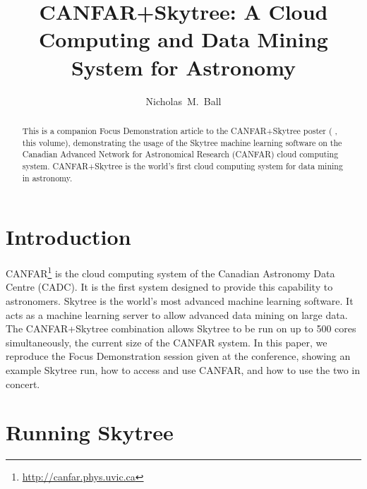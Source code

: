 
\resetcounters




\title{CANFAR+Skytree: A Cloud Computing and Data Mining System for Astronomy}
\author{Nicholas~M.~Ball
}


\begin{abstract}
This is a companion Focus Demonstration article to the CANFAR+Skytree poster (\citeauthor{ball:adass12poster} \citeyear{ball:adass12poster}, this volume), demonstrating the usage of the Skytree machine learning software on the Canadian Advanced Network for Astronomical Research (CANFAR) cloud computing system. CANFAR+Skytree is the world's first cloud computing system for data mining in astronomy.
\end{abstract}

\section{Introduction}

CANFAR\footnote{\url{http://canfar.phys.uvic.ca}} \citep{gaudet:canfar} is the cloud computing system of the Canadian Astronomy Data Centre (CADC). It is the first system designed to provide this capability to astronomers. Skytree is the world's most advanced machine learning software. It acts as a machine learning server to allow advanced data mining on large data. The CANFAR+Skytree combination allows Skytree to be run on up to 500 cores simultaneously, the current size of the CANFAR system. In this paper, we reproduce the Focus Demonstration session given at the conference, showing an example Skytree run, how to access and use CANFAR, and how to use the two in concert.

\section{Running Skytree}

